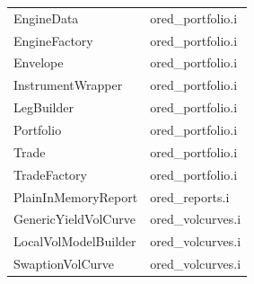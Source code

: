 \documentclass[12pt, a4paper]{report}
\begin{document}
\begin{appendix}
{\begin{longtable}{|l|l|}
EngineData & ored\_portfolio.i \\
EngineFactory & ored\_portfolio.i \\
Envelope & ored\_portfolio.i \\
InstrumentWrapper & ored\_portfolio.i \\
LegBuilder & ored\_portfolio.i \\
Portfolio & ored\_portfolio.i \\
Trade & ored\_portfolio.i \\
TradeFactory & ored\_portfolio.i \\
PlainInMemoryReport & ored\_reports.i \\
GenericYieldVolCurve & ored\_volcurves.i \\
LocalVolModelBuilder & ored\_volcurves.i \\
SwaptionVolCurve & ored\_volcurves.i \\
\hline
\end{longtable}
}


\end{appendix}
\end{document}
